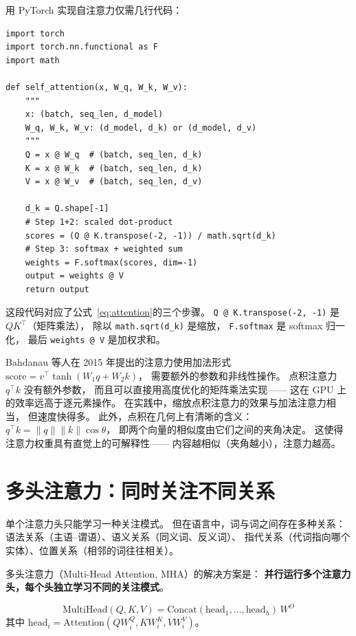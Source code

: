 用 PyTorch 实现自注意力仅需几行代码：

\begin{lstlisting}[caption={Self-Attention in PyTorch}]
import torch
import torch.nn.functional as F
import math

def self_attention(x, W_q, W_k, W_v):
    """
    x: (batch, seq_len, d_model)
    W_q, W_k, W_v: (d_model, d_k) or (d_model, d_v)
    """
    Q = x @ W_q  # (batch, seq_len, d_k)
    K = x @ W_k  # (batch, seq_len, d_k)
    V = x @ W_v  # (batch, seq_len, d_v)

    d_k = Q.shape[-1]
    # Step 1+2: scaled dot-product
    scores = (Q @ K.transpose(-2, -1)) / math.sqrt(d_k)
    # Step 3: softmax + weighted sum
    weights = F.softmax(scores, dim=-1)
    output = weights @ V
    return output
\end{lstlisting}

这段代码对应了公式~\eqref{eq:attention}的三个步骤。
\texttt{Q @ K.transpose(-2, -1)} 是 $QK^\top$（矩阵乘法），
除以 \texttt{math.sqrt(d\_k)} 是缩放，
\texttt{F.softmax} 是 softmax 归一化，
最后 \texttt{weights @ V} 是加权求和。

\begin{whybox}[为什么用点积而不是其他相似度度量？]
Bahdanau 等人在 2015 年提出的注意力使用加法形式
$\mathrm{score} = v^\top \tanh(W_1 q + W_2 k)$，
需要额外的参数和非线性操作。
点积注意力 $q^\top k$ 没有额外参数，
而且可以直接用高度优化的矩阵乘法实现——
这在 GPU 上的效率远高于逐元素操作。
在实践中，缩放点积注意力的效果与加法注意力相当，
但速度快得多。
此外，点积在几何上有清晰的含义：
$q^\top k = \|q\| \|k\| \cos\theta$，
即两个向量的相似度由它们之间的夹角决定。
这使得注意力权重具有直觉上的可解释性——
内容越相似（夹角越小），注意力越高。
\end{whybox}

\section{多头注意力：同时关注不同关系}

单个注意力头只能学习一种关注模式。
但在语言中，词与词之间存在多种关系：
语法关系（主语--谓语）、语义关系（同义词、反义词）、
指代关系（代词指向哪个实体）、位置关系（相邻的词往往相关）。

多头注意力（Multi-Head Attention, MHA）的解决方案是：
\textbf{并行运行多个注意力头，每个头独立学习不同的关注模式}。

\begin{equation}
  \mathrm{MultiHead}(Q, K, V) =
  \mathrm{Concat}(\mathrm{head}_1, \ldots, \mathrm{head}_h) \, W^O
\end{equation}
其中 $\mathrm{head}_i = \mathrm{Attention}(Q W_i^Q, K W_i^K, V W_i^V)$。

